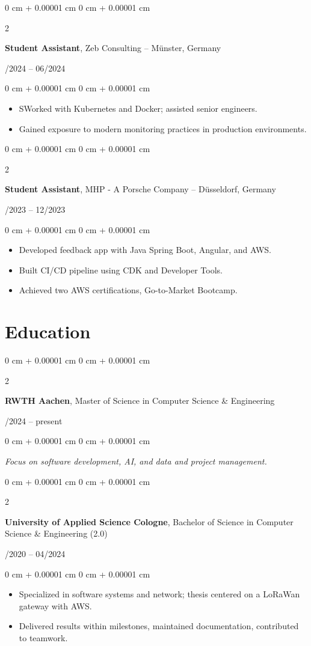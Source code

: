 \documentclass[10pt, letterpaper]{article}
\newenvironment{highlights}{
    \begin{itemize}[
        topsep=0.10 cm,
        parsep=0.10 cm,
        partopsep=0pt,
        itemsep=0pt,
        leftmargin=0 cm + 10pt
    ]
}{
    \end{itemize}
} %
\newenvironment{onecolentry}{
    \begin{adjustwidth}{
        0 cm + 0.00001 cm
    }{
        0 cm + 0.00001 cm
    }
}{
    \end{adjustwidth}
} %
\newenvironment{twocolentry}[2][]{
    \onecolentry
    \def\secondColumn{#2}
    \setcolumnwidth{\fill, 4.5 cm}
    \begin{paracol}{2}
}{
    \switchcolumn \raggedleft \secondColumn
    \end{paracol}
    \endonecolentry
} %
\begin{document}
\vspace{0.2cm}

\begin{twocolentry}{01/2024 -- 06/2024}
\textbf{Student Assistant}, Zeb Consulting -- Münster, Germany
\end{twocolentry}
\begin{onecolentry}
\begin{highlights}
\item SWorked with Kubernetes and Docker; assisted senior engineers.
\item Gained exposure to modern monitoring practices in production environments.
\end{highlights}
\end{onecolentry}

\vspace{0.2cm}

\begin{twocolentry}{03/2023 -- 12/2023}
\textbf{Student Assistant}, MHP - A Porsche Company -- Düsseldorf, Germany
\end{twocolentry}
\begin{onecolentry}
\begin{highlights}
\item Developed feedback app with Java Spring Boot, Angular, and AWS.
\item Built CI/CD pipeline using CDK and Developer Tools.
\item Achieved two AWS certifications, Go-to-Market Bootcamp.
\end{highlights}
\end{onecolentry}

\vspace{0.2cm}


  \section{Education}
\begin{twocolentry}{04/2024 -- present}
\textbf{RWTH Aachen}, Master of Science in Computer Science \& Engineering
\end{twocolentry}
\begin{onecolentry}
\textit{Focus on software development, AI, and data and project management.}
\end{onecolentry}

\vspace{0.1cm}

\begin{twocolentry}{09/2020 -- 04/2024}
\textbf{University of Applied Science Cologne}, Bachelor of Science in Computer Science \& Engineering (2.0)
\end{twocolentry}
\begin{onecolentry}
\begin{highlights}
\item Specialized in software systems and network; thesis centered on a LoRaWan gateway with AWS.
\item Delivered results within milestones, maintained documentation, contributed to teamwork.
\end{highlights}
\end{onecolentry}
\end{document}
